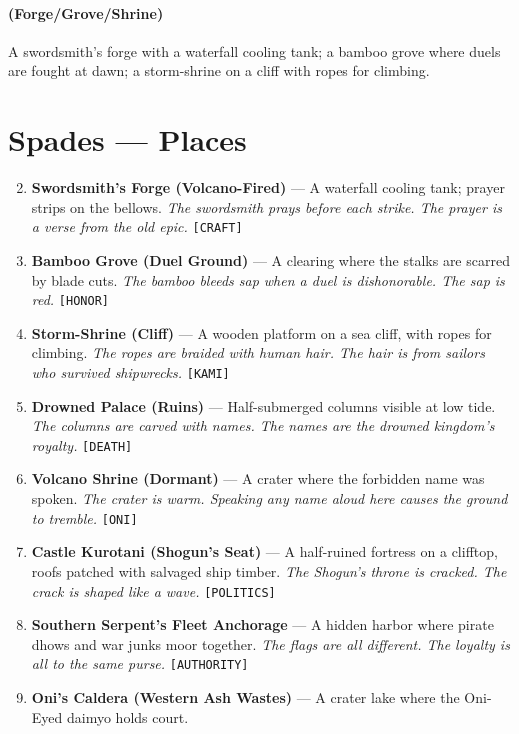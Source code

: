 \paragraph*{(Forge/Grove/Shrine)} A swordsmith's forge with a waterfall cooling tank; a bamboo grove where duels are fought at dawn; a storm-shrine on a cliff with ropes for climbing.

\section*{Spades --- Places}
\label{sec:nihori-places}
\begin{enumerate}
\setcounter{enumi}{1}
\item \textbf{Swordsmith's Forge (Volcano-Fired)} --- A waterfall cooling tank; prayer strips on the bellows.
  \hfill \textit{The swordsmith prays before each strike. The prayer is a verse from the old epic.} \texttt{[CRAFT]}
\item \textbf{Bamboo Grove (Duel Ground)} --- A clearing where the stalks are scarred by blade cuts.
  \hfill \textit{The bamboo bleeds sap when a duel is dishonorable. The sap is red.} \texttt{[HONOR]}
\item \textbf{Storm-Shrine (Cliff)} --- A wooden platform on a sea cliff, with ropes for climbing.
  \hfill \textit{The ropes are braided with human hair. The hair is from sailors who survived shipwrecks.} \texttt{[KAMI]}
\item \textbf{Drowned Palace (Ruins)} --- Half-submerged columns visible at low tide.
  \hfill \textit{The columns are carved with names. The names are the drowned kingdom's royalty.} \texttt{[DEATH]}
\item \textbf{Volcano Shrine (Dormant)} --- A crater where the forbidden name was spoken.
  \hfill \textit{The crater is warm. Speaking any name aloud here causes the ground to tremble.} \texttt{[ONI]}
\item \textbf{Castle Kurotani (Shogun's Seat)} --- A half-ruined fortress on a clifftop, roofs patched with salvaged ship timber.
  \hfill \textit{The Shogun's throne is cracked. The crack is shaped like a wave.} \texttt{[POLITICS]}
\item \textbf{Southern Serpent's Fleet Anchorage} --- A hidden harbor where pirate dhows and war junks moor together.
  \hfill \textit{The flags are all different. The loyalty is all to the same purse.} \texttt{[AUTHORITY]}
\item \textbf{Oni's Caldera (Western Ash Wastes)} --- A crater lake where the Oni-Eyed daimyo holds court.

\end{enumerate}
